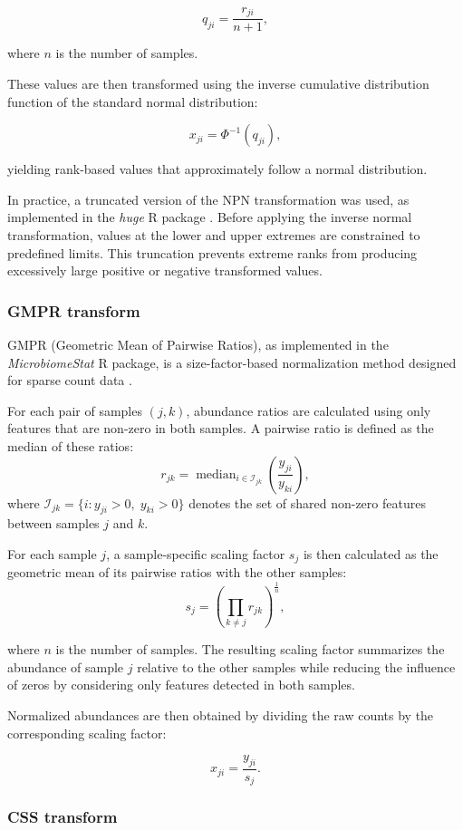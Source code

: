 \begin{bibunit}[apalike]
\begin{appendices}
\[
q_{ji} = \frac{r_{ji}}{n+1},
\]

where $n$ is the number of samples.

These values are then transformed using the inverse cumulative distribution function of the standard normal distribution:

\[
x_{ji} = \Phi^{-1}(q_{ji}),
\]

yielding rank-based values that approximately follow a normal distribution.

In practice, a truncated version of the NPN transformation was used, as implemented in the \textit{huge} R package \citep{zhao_huge_2012}. Before applying the inverse normal transformation, values at the lower and upper extremes are constrained to predefined limits. This truncation prevents extreme ranks from producing excessively large positive or negative transformed values.

\subsubsection*{GMPR transform}

GMPR (Geometric Mean of Pairwise Ratios), as implemented in the \textit{MicrobiomeStat} R package, is a size-factor-based normalization method designed for sparse count data \cite{chen_gmpr_2018}.

For each pair of samples $(j,k)$, abundance ratios are calculated using only features that are non-zero in both samples. A pairwise ratio is defined as the median of these ratios:
\[
r_{jk} = \operatorname{median}_{i \in \mathcal{I}_{jk}} \left( \frac{y_{ji}}{y_{ki}} \right),
\]
where $\mathcal{I}_{jk} = \{i:y_{ji}>0,\;y_{ki}>0\}$ denotes the set of shared non-zero features between samples $j$ and $k$.

For each sample $j$, a sample-specific scaling factor $s_j$ is then calculated as the geometric mean of its pairwise ratios with the other samples:
\[
s_j = \left( \prod_{k \neq j} r_{jk} \right)^{\frac{1}{n}},
\]


where $n$ is the number of samples. The resulting scaling factor summarizes the abundance of sample $j$ relative to the other samples while reducing the influence of zeros by considering only features detected in both samples.

Normalized abundances are then obtained by dividing the raw counts by the corresponding scaling factor:

\[
x_{ji} = \frac{y_{ji}}{s_j}.
\]

\subsubsection*{CSS transform}


\end{appendices}
\end{bibunit}
